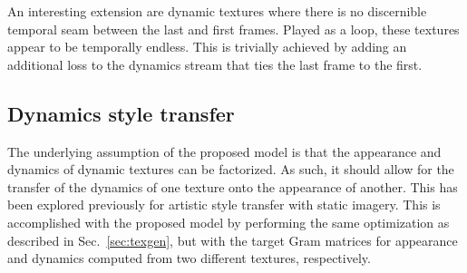 An interesting extension are dynamic textures where there is no discernible temporal seam between the last and first frames. Played as a loop, these textures appear to be temporally endless. This is trivially achieved by adding an additional loss to the dynamics stream that ties the last frame to the first. 

\subsection{Dynamics style transfer}

The underlying assumption of the proposed model is that the appearance
and dynamics of dynamic textures can be factorized.
As such, it should allow for the transfer of the dynamics of
one texture onto the appearance of another.
This has been explored previously for artistic style transfer
\cite{champandard2016,gatys2017} with static imagery.
This is accomplished with the proposed model by performing the same 
optimization as described in Sec.\ \ref{sec:texgen}, but with the target Gram matrices for 
appearance and dynamics computed from two different textures, respectively.